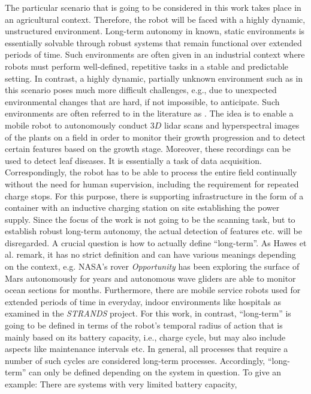 \documentclass[english, master, utf8]{base/thesis_KBS}
\begin{document}
The particular scenario that is going to be considered in this work takes place in an agricultural context. Therefore, the robot will be faced with a highly dynamic, unstructured
environment. Long-term autonomy in known, static environments is essentially solvable through robust systems that remain functional over extended periods of time. \cite{Kunze:2018}
Such environments are often given in an industrial context where robots must perform well-defined, repetitive tasks in a stable and predictable setting. \cite{Bechar:2016}
In contrast, a highly dynamic, partially unknown environment such as in this scenario poses much more difficult
challenges, e.g., due to unexpected environmental changes that are hard, if not impossible, to anticipate.
Such environments are often referred to in the literature as .
The idea is to enable a mobile robot to autonomously conduct $3D$ lidar scans and hyperspectral images of the plants on a field in order to monitor their growth progression and 
to detect certain features based on the growth stage. Moreover, these recordings can be used to detect leaf diseases. It is essentially a task of data acquisition.
Correspondingly, the robot has to be able to process the entire field continually without the need for human supervision,
including the requirement for repeated charge stops. For this purpose, there is supporting infrastructure in the form of a container with an inductive charging station on site
establishing the power supply. Since the focus of the work is not going to be the scanning task, but to establish robust long-term autonomy, the actual detection of features 
etc. will be disregarded.
A crucial question is how to actually define ``long-term''. As Hawes et al. remark, it has no strict definition and can have various meanings depending
on the context, e.g. NASA's rover \textit{Opportunity} has been exploring the surface of Mars autonomously for years and autonomous wave gliders are able to monitor
ocean sections for months. Furthermore, there are mobile service robots used for extended periods of time in everyday, indoor environments like hospitals 
as examined in the \textit{STRANDS} project. \cite{Hawes:2017}
For this work, in contrast, ``long-term'' is going to be defined in terms of the robot's temporal radius of action that is mainly based on its battery capacity, i.e., charge cycle,
but may also include aspects like maintenance intervals etc. In general, all processes that require a number of such cycles are considered long-term processes.
Accordingly, ``long-term'' can only be defined depending on the system in question. To give an example: There are systems with very limited battery capacity, 
\end{document}
